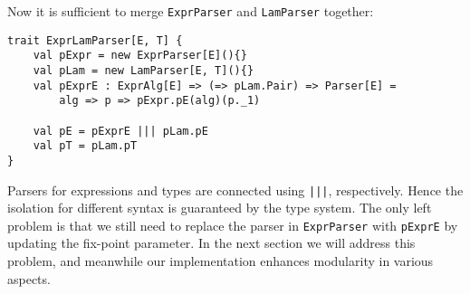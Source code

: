 Now it is sufficient to merge \lstinline{ExprParser} and \lstinline{LamParser} together:
\begin{lstlisting}
trait ExprLamParser[E, T] {
    val pExpr = new ExprParser[E](){}
    val pLam = new LamParser[E, T](){}
    val pExprE : ExprAlg[E] => (=> pLam.Pair) => Parser[E] =
        alg => p => pExpr.pE(alg)(p._1)

    val pE = pExprE ||| pLam.pE
    val pT = pLam.pT
}
\end{lstlisting}
Parsers for expressions and types are connected using \lstinline{|||}, respectively. Hence the isolation for different syntax
is guaranteed by the type system. The only left problem is that we still need to replace the parser in \lstinline{ExprParser} with \lstinline{pExprE}
by updating the fix-point parameter. In the next section we will address this problem, and meanwhile our implementation enhances modularity in various aspects.


